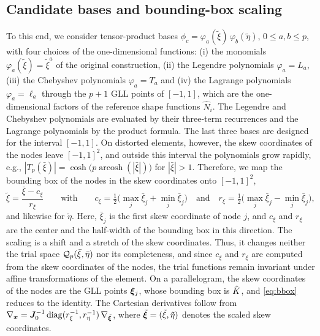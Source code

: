 \subsection{Candidate bases and bounding-box scaling}
\label{sec:basis-candidates}
%
To this end, we consider tensor-product bases $\phi_c=\varphi_a(\tilde\xi)\,\varphi_b(\tilde\eta)$, $0\le a,b\le p$, with four choices of the one-dimensional functions: (i) the monomials $\varphi_a(\tilde\xi)=\tilde\xi^a$ of the original construction, (ii) the Legendre polynomials $\varphi_a=L_a$, (iii) the Chebyshev polynomials $\varphi_a=T_a$ and (iv) the Lagrange polynomials $\varphi_a=\ell_a$ through the $p+1$ GLL points of $[-1,1]$, which are the one-dimensional factors of the reference shape functions $\hat N_i$. The Legendre and Chebyshev polynomials are evaluated by their three-term recurrences and the Lagrange polynomials by the product formula. The last three bases are designed for the interval $[-1,1]$. On distorted elements, however, the skew coordinates of the nodes leave $[-1,1]^2$, and outside this interval the polynomials grow rapidly, e.g., $|T_p(\bar\xi)|=\cosh\bigl(p\operatorname{arcosh}(|\bar\xi|)\bigr)$ for $|\bar\xi|>1$. Therefore, we map the bounding box of the nodes in the skew coordinates onto $[-1,1]^2$,
%
\begin{equation}
  \tilde\xi=\frac{\bar\xi-c_{\xi}}{r_{\xi}}\qquad\text{with}\qquad
  c_{\xi}=\tfrac12\bigl(\max_j\bar\xi_j+\min_j\bar\xi_j\bigr)\quad\text{and}\quad
  r_{\xi}=\tfrac12\bigl(\max_j\bar\xi_j-\min_j\bar\xi_j\bigr),
  \label{eq:bbox}
\end{equation}
%
and likewise for $\tilde\eta$. Here, $\bar\xi_j$ is the first skew coordinate of node $j$, and $c_\xi$ and $r_\xi$ are the center and the half-width of the bounding box in this direction. The scaling is a shift and a stretch of the skew coordinates. Thus, it changes neither the trial space $\mathcal Q_p(\bar\xi,\bar\eta)$ nor its completeness, and since $c_\xi$ and $r_\xi$ are computed from the skew coordinates of the nodes, the trial functions remain invariant under affine transformations of the element. On a parallelogram, the skew coordinates of the nodes are the GLL points $\bm\xi_j$, whose bounding box is $\hat K$, and \cref{eq:bbox} reduces to the identity. The Cartesian derivatives follow from $\nabla_{\bm{x}}=\bm{J}_0^{-1}\operatorname{diag}(r_{\xi}^{-1},r_{\eta}^{-1})\,\nabla_{\tilde{\bm\xi}}$, where $\tilde{\bm\xi}=(\tilde\xi,\tilde\eta)$ denotes the scaled skew coordinates.
%

